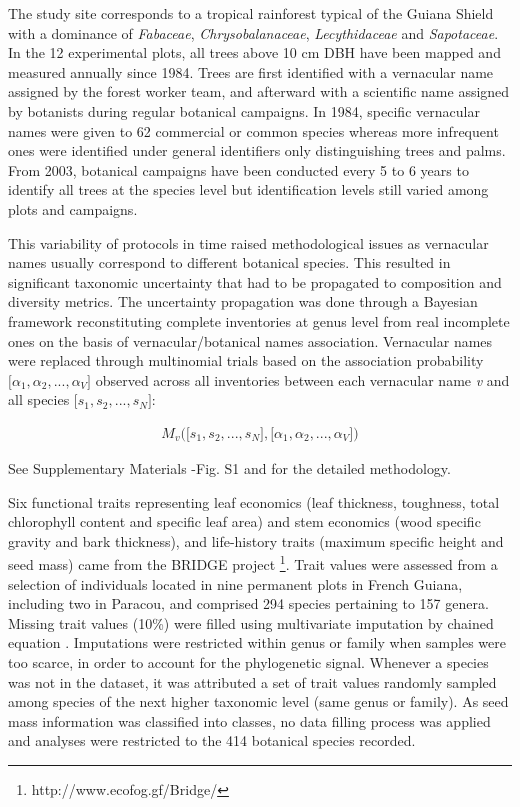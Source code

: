 \documentclass[fleqn,10pt]{ArtEcoFoG} %
\begin{document}
The study site corresponds to a tropical rainforest typical of the
Guiana Shield with a dominance of \emph{Fabaceae},
\emph{Chrysobalanaceae}, \emph{Lecythidaceae} and \emph{Sapotaceae}. In
the 12 experimental plots, all trees above 10 cm DBH have been mapped
and measured annually since 1984. Trees are first identified with a
vernacular name assigned by the forest worker team, and afterward with a
scientific name assigned by botanists during regular botanical
campaigns. In 1984, specific vernacular names were given to 62
commercial or common species whereas more infrequent ones were
identified under general identifiers only distinguishing trees and
palms. From 2003, botanical campaigns have been conducted every 5 to 6
years to identify all trees at the species level but identification
levels still varied among plots and campaigns.

This variability of protocols in time raised methodological issues as
vernacular names usually correspond to different botanical species. This
resulted in significant taxonomic uncertainty that had to be propagated
to composition and diversity metrics. The uncertainty propagation was
done through a Bayesian framework reconstituting complete inventories at
genus level from real incomplete ones on the basis of
vernacular/botanical names association. Vernacular names were replaced
through multinomial trials based on the association probability
\(\big[\alpha_1, \alpha_2,..., \alpha_V\big]\) observed across all
inventories between each vernacular name \emph{v} and all species
\(\big[s_1, s_2,..., s_N\big]\):

\begin{align}
M_v\Big(\big[s_1, s_2,..., s_N\big],\big[\alpha_1, \alpha_2,..., \alpha_V\big]\Big) \nonumber
\end{align}

See Supplementary Materials -Fig. S1 and \citet{Aubry-Kientz2013} for
the detailed methodology.

Six functional traits representing leaf economics (leaf thickness,
toughness, total chlorophyll content and specific leaf area) and stem
economics (wood specific gravity and bark thickness), and life-history
traits (maximum specific height and seed mass) came from the BRIDGE
project \footnote{http://www.ecofog.gf/Bridge/}. Trait values were
assessed from a selection of individuals located in nine permanent plots
in French Guiana, including two in Paracou, and comprised 294 species
pertaining to 157 genera. Missing trait values (10\%) were filled using
multivariate imputation by chained equation \citep{Mice2011}.
Imputations were restricted within genus or family when samples were too
scarce, in order to account for the phylogenetic signal. Whenever a
species was not in the dataset, it was attributed a set of trait values
randomly sampled among species of the next higher taxonomic level (same
genus or family). As seed mass information was classified into classes,
no data filling process was applied and analyses were restricted to the
414 botanical species recorded.
\end{document}
